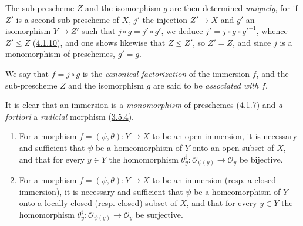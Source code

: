 The sub-prescheme $Z$ and the isomorphism $g$ are then determined
\emph{uniquely}, for if $Z'$ is a second sub-prescheme of $X$, $j'$ the
injection $Z'\to X$ and $g'$ an isomorphism $Y\to Z'$ such that
$j\circ g=j'\circ g'$, we deduce $j'=j\circ g\circ {g'}^{-1}$, whence
$Z'\leq Z$ (\hyperref[I.4.1.10]{4.1.10}), and one shows likewise that
$Z\leq Z'$, so $Z'=Z$, and since $j$ is a monomorphism of preschemes,
$g'=g$.

We say that $f=j\circ g$ is the \emph{canonical factorization} of the
immersion $f$, and the sub-prescheme $Z$ and the isomorphism $g$ are said to be
\emph{associated with $f$}.

It is clear that an immersion is a \emph{monomorphism} of preschemes
(\hyperref[I.4.1.7]{4.1.7}) and \emph{a fortiori} a \emph{radicial}
morphism (\hyperref[I.3.5.4]{3.5.4}).

\begin{proposition}[4.2.2]
\label{I.4.2.2}
\begin{enumerate}
  \item[\textup{a)}] For a morphism $f=(\psi,\theta):Y\to X$ to be an
  open immersion, it is necessary and sufficient that $\psi$ be a
  homeomorphism of $Y$ onto an open subset of $X$, and that for every
  $y\in Y$ the homomorphism
  $\theta_y^\sharp:\mathscr{O}_{\psi(y)}\to\mathscr{O}_y$ be bijective.
  \item[\textup{b)}] For a morphism $f=(\psi,\theta):Y\to X$ to be an
  immersion (\textup{resp.} a closed immersion), it is necessary and
  sufficient that $\psi$ be a homeomorphism of $Y$ onto a locally closed
  (\textup{resp.} closed) subset of $X$, and that for every $y\in Y$ the homomorphism
  $\theta_y^\sharp:\mathscr{O}_{\psi(y)}\to\mathscr{O}_y$ be surjective.
\end{enumerate}
\end{proposition}

